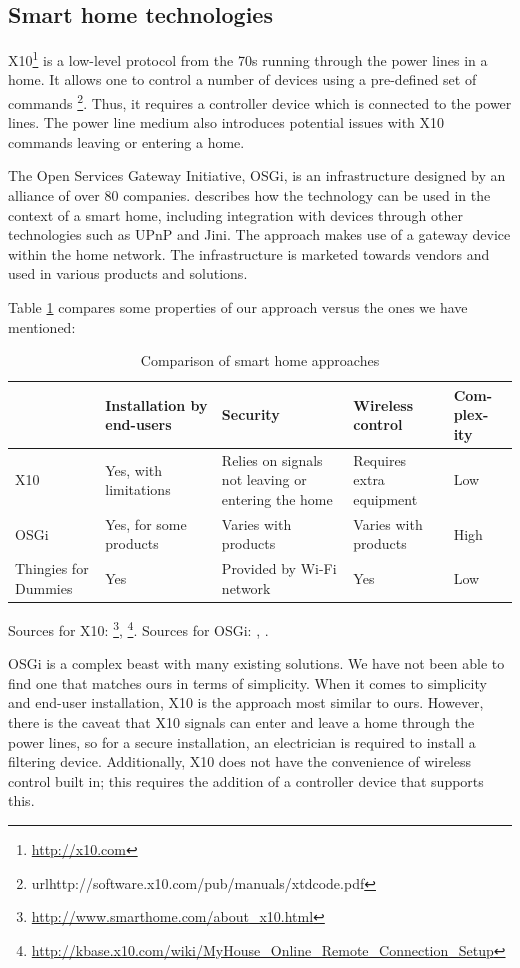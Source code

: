 \documentclass{ubicomp2012}
\begin{document}
\subsection{Smart home technologies}

X10\footnote{\url{http://x10.com}} is a low-level protocol from the 70s running through the power lines in a home. It allows one to control a number of devices using a pre-defined set of commands \footnote{url{http://software.x10.com/pub/manuals/xtdcode.pdf}}. Thus, it requires a controller device which is connected to the power lines. The power line medium also introduces potential issues with X10 commands leaving or entering a home.

The Open Services Gateway Initiative, OSGi\cite{osgiIntroduction}, is an infrastructure designed by an alliance of over 80 companies. \cite{osgiDiscovery} describes how the technology can be used in the context of a smart home, including integration with devices through other technologies such as UPnP and Jini. The approach makes use of a gateway device within the home network. The infrastructure is marketed towards vendors and used in various products and solutions\cite{osgiMarkets}.

Table \ref{smartHomeTable} compares some properties of our approach versus the ones we have mentioned:
\begin{table}[H]
\centering
\begin{tabular}{| p{1cm} | p{1.5cm} | p{1.5cm} | p{1.5cm} | p{0.8cm} |}
\hline
& Installation by end-users & Security & Wireless control & Com-plex-ity \\ \hline
X10 & Yes, with limitations & Relies on signals not leaving or entering the home & Requires extra equipment & Low \\ \hline
OSGi & Yes, for some products & Varies with products & Varies with products & High \\ \hline
Thingies for Dummies & Yes & Provided by Wi-Fi network & Yes & Low \\ \hline
\end{tabular}
\caption{Comparison of smart home approaches}
\label{smartHomeTable}
\end{table}

Sources for X10: \footnote{\url{http://www.smarthome.com/about_x10.html}}, \footnote{\url{http://kbase.x10.com/wiki/MyHouse_Online_Remote_Connection_Setup}}. Sources for OSGi: \cite{osgiMarkets}, \cite{osgiDiscovery}.

OSGi is a complex beast with many existing solutions. We have not been able to find one that matches ours in terms of simplicity. When it comes to simplicity and end-user installation, X10 is the approach most similar to ours. However, there is the caveat that X10 signals can enter and leave a home through the power lines, so for a secure installation, an electrician is required to install a filtering device. Additionally, X10 does not have the convenience of wireless control built in; this requires the addition of a controller device that supports this.
\end{document}
